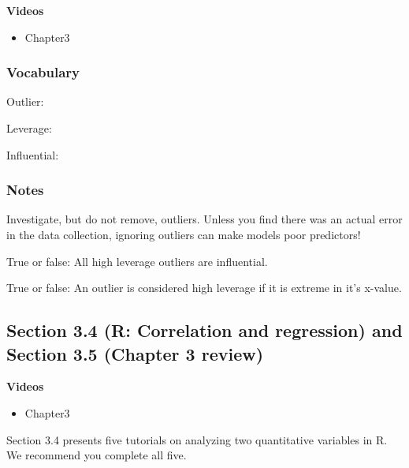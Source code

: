 \documentclass[
]{report}
\providecommand{\tightlist}{%
  \setlength{\itemsep}{0pt}\setlength{\parskip}{0pt}}
\newcommand{\rgs}{\vspace{12pt}} %
\begin{document}

\textbf{Videos}

\begin{itemize}
\tightlist
\item
  Chapter3
\end{itemize}


\hypertarget{vocabulary-8}{%
\subsubsection*{Vocabulary}\label{vocabulary-8}}

Outlier:
\rgs

Leverage:
\rgs

Influential:
\rgs

\hypertarget{notes-10}{%
\subsubsection*{Notes}\label{notes-10}}

Investigate, but do not remove, outliers. Unless you find there was an actual error in the data collection, ignoring outliers can make models poor predictors!

True or false: All high leverage outliers are influential.

True or false: An outlier is considered high leverage if it is extreme in it's x-value.

\hypertarget{section-3.4-r-correlation-and-regression-and-section-3.5-chapter-3-review}{%
\subsection*{Section 3.4 (R: Correlation and regression) and Section 3.5 (Chapter 3 review)}\label{section-3.4-r-correlation-and-regression-and-section-3.5-chapter-3-review}}


\textbf{Videos}

\begin{itemize}
\tightlist
\item
  Chapter3
\end{itemize}


Section 3.4 presents five tutorials on analyzing two quantitative variables in R. We recommend you complete all five.
\end{document}
